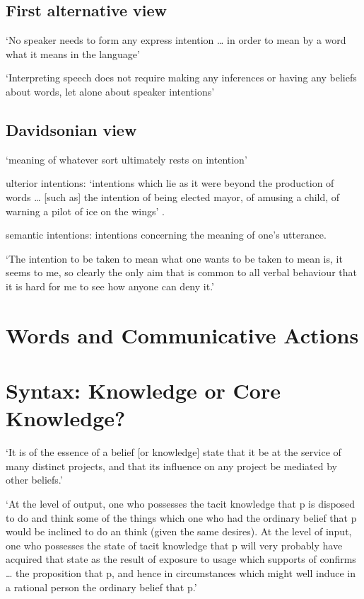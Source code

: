 \documentclass[12pt]{extarticle}
\begin{document}
\begin{multicols}{3}
\begin{enumerate}
\end{enumerate}
 
\subsection{First alternative view}
 
‘No speaker needs to form any express intention … in order to mean by a word what it means in the language’
\citep[p.\ 473]{Dummett:1986mq}
 
‘Interpreting speech does not require making any inferences or having any beliefs about words, let alone about speaker intentions’
\citep[p.\ 62]{Millikan:1984ib}
 
\subsection{Davidsonian view}
 
‘meaning of whatever sort ultimately rests on intention’
\citep[p.\ 298]{Davidson:1992pl}
 
ulterior intentions: ‘intentions which lie as it were beyond the production of words … [such as] the intention of being elected mayor, of amusing a child, of warning a pilot of ice on the wings’ \citep[p.\ 298]{Davidson:1992pl}.
 
semantic intentions: intentions concerning the meaning of one’s utterance.
 
‘The intention to be taken to mean what one wants to be taken to mean is, it seems to me, so clearly the only aim that is common to all verbal behaviour that it is hard for me to see how anyone can deny it.’
\citep[p.\ 11]{Davidson:1994ol}
 
 
 
\section{Words and Communicative Actions}
 
 
 
\section{Syntax: Knowledge or Core Knowledge?}
 
‘It is of the essence of a belief [or knowledge] state that it be at the service of many distinct projects, and that its influence on any project be mediated by other beliefs.’
\citep[p.\ 337]{Evans:1981pc}
 
‘At the level of output, one who possesses the tacit knowledge that p is disposed to do and think some of the things which one who had the ordinary belief that p would be inclined to do an think (given the same desires).
At the level of input, one who possesses the state of tacit knowledge that p will very probably have acquired that state as the result of exposure to usage which supports of confirms … the proposition that p, and hence in circumstances which might well induce in a rational person the ordinary belief that p.’
\citep[p.\ 336]{Evans:1981pc}
 

\end{multicols}
\end{document}
